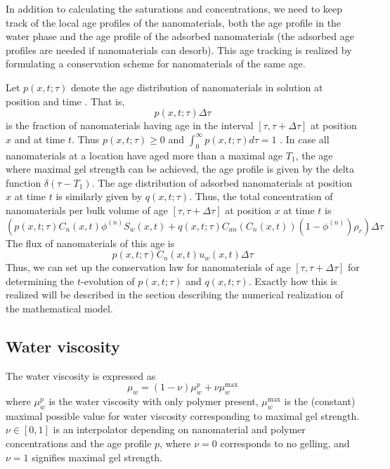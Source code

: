 \documentclass[nanomaterials,article,submit,moreauthors,pdftex]{Definitions/mdpi}
\begin{document}
In addition to calculating the saturations and concentrations, we need to keep track of the local age profiles of the nanomaterials, both the age profile in the water phase and the age profile of the adsorbed nanomaterials (the adsorbed age profiles are needed if nanomaterials can desorb). This age tracking is realized by formulating a conservation scheme for nanomaterials of the same age.   

Let  $p(x,t;\tau)$ denote the age distribution of nanomaterials in solution at position  and time  . That is, 
\begin{equation*}
    p(x,t;\tau)\Delta\tau
\end{equation*}
is the fraction of nanomaterials having age in the interval $[\tau, \tau+\Delta\tau]$  at position $x$ and at time $t$. Thus $p(x,t;\tau)\geq 0$ and $\int_{0}^{\infty}{p(x,t;\tau)d\tau}=1$ . In case all nanomaterials at a location have aged more than a maximal age $T_1$, the age where maximal gel strength can be achieved, the age profile is given by the delta function $\delta(\tau-T_1)$. The age distribution of adsorbed nanomaterials at position $x$ at time $t$ is similarly given by $q(x,t;\tau)$. Thus, the total concentration of nanomaterials per bulk volume of age  $[\tau, \tau+\Delta\tau]$ at position $x$ at time $t$ is
\begin{equation}
    \left(p(x,t;\tau)C_n(x,t)\phi^{(n)}S_w(x,t)+q(x,t;\tau)C_{an}\left(C_n(x,t)\right)(1-\phi^{(n)})\rho_r\right)\Delta\tau
\end{equation}
The flux of nanomaterials of this age is
\begin{equation}
    p(x,t;\tau)C_n(x,t)u_w(x,t)\Delta\tau
\end{equation}
Thus, we can set up the conservation law for nanomaterials of age $[\tau, \tau+\Delta\tau]$  for determining the   $t$-evolution of $p(x,t;\tau)$ and $q(x,t;\tau)$. Exactly how this is realized will be described in the section describing the numerical realization of the mathematical model.

\subsection{Water viscosity}
The water viscosity is expressed as
\begin{equation}
    \mu_w=(1-\nu)\mu^p_w + \nu\mu_w^{\max}
\end{equation}
where $\mu^p_w$ is the water viscosity with only polymer present, $\mu_w^{\max}$ is the (constant) maximal possible value for water viscosity corresponding to maximal gel strength. $\nu\in[0,1]$ is an interpolator depending on nanomaterial and polymer concentrations and the age profile $p$, where  $\nu=0$ corresponds to no gelling, and $\nu=1$  signifies maximal gel strength.
\end{document}
